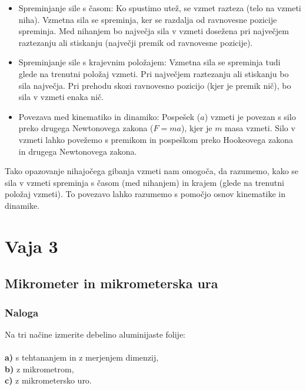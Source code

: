 \documentclass{report}
\begin{document}
    \begin{itemize}
      \item Spreminjanje sile s časom:
        Ko spustimo utež, se vzmet razteza (telo na vzmeti niha). Vzmetna sila se spreminja, ker se razdalja od ravnovesne pozicije spreminja.
        Med nihanjem bo največja sila v vzmeti dosežena pri največjem raztezanju ali stiskanju (največji premik od ravnovesne pozicije).

    \item Spreminjanje sile s krajevnim položajem:
        Vzmetna sila se spreminja tudi glede na trenutni položaj vzmeti. Pri največjem raztezanju ali stiskanju bo sila največja.
        Pri prehodu skozi ravnovesno pozicijo (kjer je premik nič), bo sila v vzmeti enaka nič.

    \item Povezava med kinematiko in dinamiko:
        Pospešek ($a$) vzmeti je povezan s silo preko drugega Newtonovega zakona ($F = ma$), kjer je $m$ masa vzmeti.
        Silo v vzmeti lahko povežemo s premikom in pospeškom preko Hookeovega zakona in drugega Newtonovega zakona.
    \end{itemize}
    

\noindent Tako opazovanje nihajočega gibanja vzmeti nam omogoča, da razumemo, kako se sila v vzmeti spreminja s časom (med nihanjem) in krajem (glede na trenutni položaj vzmeti). To povezavo lahko razumemo s pomočjo osnov kinematike in dinamike.



\chapter{Vaja 3}

\section{Mikrometer in mikrometerska ura}

\subsection{Naloga}

Na tri načine izmerite debelino aluminijaste folije: \\\\
\textbf{a)} s tehtananjem in z merjenjem dimenzij, \\
\textbf{b)} z mikrometrom, \\
\textbf{c)} z mikrometersko uro.
\end{document}
